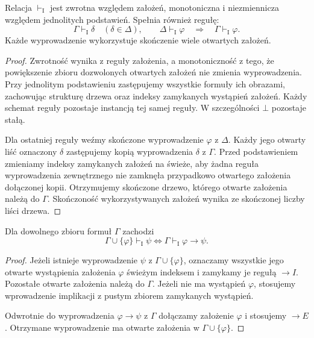 \begin{stwierdzenie}
\label{prop:ncl-ipc-structural}
Relacja $\vdash_{\mathrm I}$ jest zwrotna względem
założeń, monotoniczna i niezmiennicza względem
jednolitych podstawień. Spełnia również regułę:
\[
 \Gamma\vdash_{\mathrm I}\delta\quad(\delta\in\Delta),
 \qquad \Delta\vdash_{\mathrm I}\varphi
 \quad\Longrightarrow\quad
 \Gamma\vdash_{\mathrm I}\varphi.
\]
Każde wyprowadzenie wykorzystuje skończenie wiele
otwartych założeń.
\end{stwierdzenie}
\begin{proof}
Zwrotność wynika z reguły założenia, a monotoniczność
z tego, że powiększenie zbioru dozwolonych otwartych
założeń nie zmienia wyprowadzenia.
Przy jednolitym podstawieniu zastępujemy wszystkie
formuły ich obrazami, zachowując strukturę drzewa
oraz indeksy zamykanych wystąpień założeń.
Każdy schemat reguły pozostaje instancją tej samej reguły.
W szczególności $\bot$ pozostaje stałą.

Dla ostatniej reguły weźmy skończone wyprowadzenie
$\varphi$ z $\Delta$. Każdy jego otwarty liść
oznaczony $\delta$ zastępujemy kopią wyprowadzenia
$\delta$ z $\Gamma$. Przed podstawieniem zmieniamy
indeksy zamykanych założeń na świeże, aby żadna
reguła wyprowadzenia zewnętrznego nie zamknęła
przypadkowo otwartego założenia dołączonej kopii.
Otrzymujemy skończone drzewo, którego otwarte
założenia należą do $\Gamma$.
Skończoność wykorzystywanych założeń wynika
ze skończonej liczby liści drzewa.
\end{proof}

\begin{twierdzenie}
\label{thm:ncl-ipc-deduction}
Dla dowolnego zbioru formuł $\Gamma$ zachodzi
\[
 \Gamma\cup\{\varphi\}\vdash_{\mathrm I}\psi
 \iff \Gamma\vdash_{\mathrm I}\varphi\to\psi.
\]
\end{twierdzenie}
\begin{proof}
Jeżeli istnieje wyprowadzenie $\psi$ z
$\Gamma\cup\{\varphi\}$, oznaczamy wszystkie jego
otwarte wystąpienia założenia $\varphi$ świeżym
indeksem i zamykamy je regułą $\to I$.
Pozostałe otwarte założenia należą do $\Gamma$.
Jeżeli nie ma wystąpień $\varphi$, stosujemy
wprowadzenie implikacji z pustym zbiorem zamykanych
wystąpień.

Odwrotnie do wyprowadzenia $\varphi\to\psi$ z
$\Gamma$ dołączamy założenie $\varphi$ i stosujemy
$\to E$. Otrzymane wyprowadzenie ma otwarte
założenia w $\Gamma\cup\{\varphi\}$.
\end{proof}

